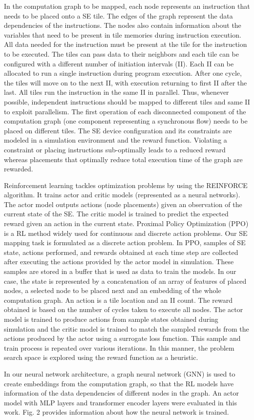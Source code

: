 In the computation graph to be mapped, each node represents an instruction that needs to be placed onto a SE tile. 
The edges of the graph represent the data dependencies of the instructions. 
The nodes also contain information about the variables that need to be present in tile memories during instruction execution. 
All data needed for the instruction must be present at the tile for the instruction to be executed. 
The tiles can pass data to their neighbors and each tile can be configured with a different number of initiation intervals (II). 
Each II can be allocated to run a single instruction during program execution. 
After one cycle, the tiles will move on to the next II, with execution returning to first II after the last. 
All tiles run the instruction in the same II in parallel. 
Thus, whenever possible, independent instructions should be mapped to different tiles and same II to exploit parallelism. 
The first operation of each disconnected component of the computation graph (one component representing a synchronous flow) needs to be placed on different tiles. 
The SE device configuration and its constraints are modeled in a simulation environment and the reward function. 
Violating a constraint or placing instructions sub-optimally leads to a reduced reward whereas placements that optimally reduce total execution time of the graph are rewarded. 

Reinforcement learning tackles optimization problems by using the REINFORCE algorithm. 
It trains actor and critic models (represented as a neural networks). 
The actor model outputs actions (node placements) given an observation of the current state of the SE. 
The critic model is trained to predict the expected reward given an action in the current state. 
Proximal Policy Optimization (PPO) is a RL method widely used for continuous and discrete action problems. 
Our SE mapping task is formulated as a discrete action problem. 
In PPO, samples of SE state, actions performed, and rewards obtained at each time step are collected after executing the actions provided by the actor model in simulation. 
These samples are stored in a buffer that is used as data to train the models. In our case, the state is represented by a concatenation of an array of features of placed nodes, a selected node to be placed next and an embedding of the whole computation graph. An action is a tile location and an II count. The reward obtained is based on the number of cycles taken to execute all nodes. The actor model is trained to produce actions from sample states obtained during simulation and the critic model is trained to match the sampled rewards from the actions produced by the actor using a surrogate loss function. This sample and train process is repeated over various iterations. In this manner, the problem search space is explored using the reward function as a heuristic.  

In our neural network architecture, a graph neural network (GNN) is used to create embeddings from the computation graph, so that the RL models have information of the data dependencies of different nodes in the graph. 
An actor model with MLP layers and transformer encoder layers were evaluated in this work. Fig. 2 provides information about how the neural network is trained. 